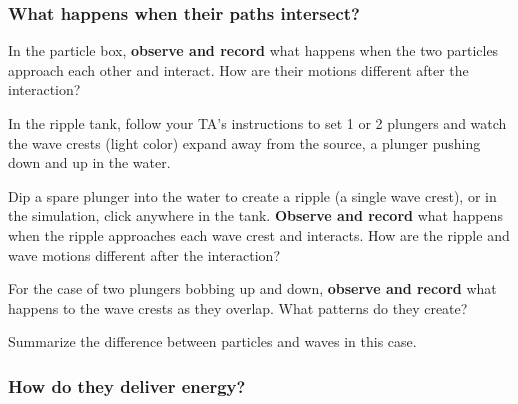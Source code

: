 \subsubsection{What happens when their paths intersect?}


\begin{steps}
	\item In the particle box, \textbf{observe and record} what happens when the two particles approach each other and interact. How are their motions different after the interaction?
	
	\item In the ripple tank, follow your TA's instructions to set 1 or 2 plungers and watch the wave crests (light color) expand away from the source, a plunger pushing down and up in the water.
	
	\item Dip a spare plunger into the water to create a ripple (a single wave crest), or in the simulation, click anywhere in the tank. \textbf{Observe and record} what happens when the ripple approaches each wave crest and interacts. How are the ripple and wave motions different after the interaction?
	
	\item For the case of two plungers bobbing up and down, \textbf{observe and record} what happens to the wave crests as they overlap. What patterns do they create?

	\item Summarize the difference between particles and waves in this case.

\end{steps}

\subsubsection{How do they deliver energy?}

